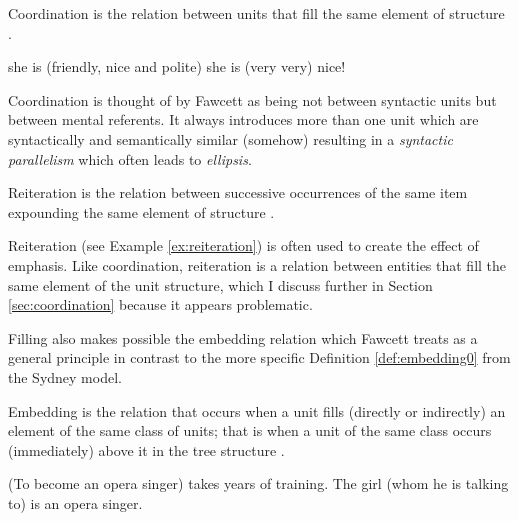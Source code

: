     \begin{definition}[Coordination]\label{def:coordination}
        Coordination is the relation between units that fill the same element of structure \citep[263]{Fawcett2000}. 
    \end{definition}
    
    \begin{exe}
        \ex\label{ex:coordination} she is (friendly, nice and polite)
        \ex\label{ex:reiteration} she is (very very) nice!
    \end{exe}
    
    Coordination is thought of by Fawcett as being not between syntactic units but between mental referents. It always introduces more than one unit which are syntactically and semantically similar (somehow) resulting in a \textit{syntactic parallelism} which often leads to \textit{ellipsis}. 
    
    \begin{definition}[Reiteration]\label{def:reiteration}
        Reiteration is the relation between successive occurrences of the same item expounding the same element of structure  \citep[271]{Fawcett2000}. 
    \end{definition}
    
    Reiteration (see Example \ref{ex:reiteration}) is often used to create the effect of emphasis. Like coordination, reiteration is a relation between entities that fill the same element of the unit structure, which I discuss further in Section \ref{sec:coordination} because it appears problematic.
    
    Filling also makes possible the embedding relation  which Fawcett treats as a general principle in contrast to the more specific Definition \ref{def:embedding0} from the Sydney model.
    
    \begin{definition}\label{def:embedding}
        Embedding is the relation that occurs when a unit fills (directly or indirectly) an element of the same class of units; that is when a unit of the same class occurs (immediately) above it in the tree structure \citep[264]{Fawcett2000}. 
    \end{definition}
    
    \begin{exe}
        \ex\label{ex:embedding-direct} (To become an opera singer) takes years of training.
        \ex\label{ex:embedding-indirect} The girl (whom he is talking to) is an opera singer.
    \end{exe}
    

